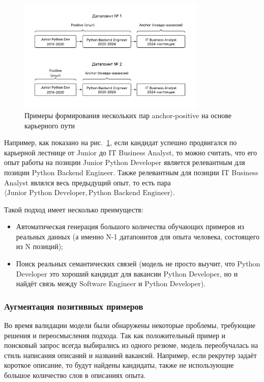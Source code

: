 \documentclass[14pt]{mmcs_article}
\begin{document}
\begin{figure}[h]
  \centering
  \includegraphics[width=0.8\textwidth]{plots/career_path_example.pdf}
  \caption{Примеры формирования нескольких пар anchor-positive на основе карьерного пути}
  \label{fig:career_path_example}
\end{figure}

Например, как показано на рис.~\ref{fig:career_path_example}, если кандидат успешно продвигался по карьерной лестнице от Junior до IT Business Analyst, то можно считать, что его опыт работы на позиции Junior Python Developer является релевантным для позиции Python Backend Engineer. Также релевантным для позиции IT Business Analyst являлся весь предыдущий опыт, то есть пара $\langle\text{Junior Python Developer},\text{Python Backend Engineer}\rangle$.

Такой подход имеет несколько преимуществ:
\begin{itemize}
  \item Автоматическая генерация большого количества обучающих примеров из реальных данных (а именно N-1 датапоинтов для опыта человека, состоящего из N позиций);
  \item Поиск реальных семантических связей (модель не просто выучит, что Python Developer это хороший кандидат для вакансии Python Developer, но и найдёт связь между Software Engineer и Python Developer).
\end{itemize}

\subsubsection{Аугментация позитивных примеров}

Во время валидации модели были обнаружены некоторые проблемы, требующие решения и переосмысления подхода.
Так как положительный пример и поисковый запрос всегда выбирались из одного резюме, модель переобучалась на стиль написания описаний и названий вакансий. Например, если рекрутер задаёт короткое описание, то будут найдены кандидаты, также не использующие большое количество слов в описаниях опыта.
\end{document}
